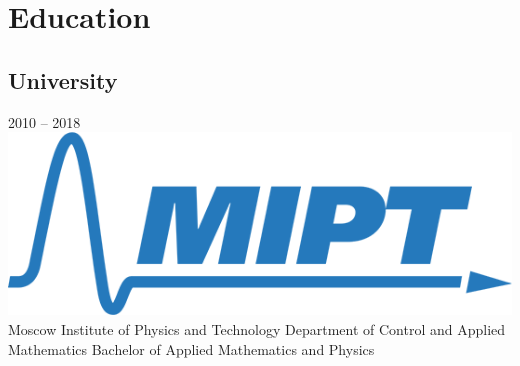 \documentclass[11pt,a4paper]{moderncv}
\begin{document}
\section{Education}
  \subsection{University}
  \cventry
    {2010 – 2018}
    {\includegraphics[scale=0.5]{mipt-en-blue} Moscow Institute of Physics and Technology}
    {}
    {}{}
    {
      Department of Control and Applied Mathematics \newline{}
      Bachelor of Applied Mathematics and Physics \newline{}
    }
    {}
\end{document}
